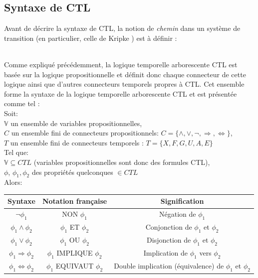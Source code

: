\documentclass[runningheads,a4paper,10pt]{llncs}
\begin{document}
\subsection{Syntaxe de CTL} \label{sec:syntaxe-CTL}
Avant de décrire la syntaxe de CTL, la notion de \textit{chemin} dans un système de transition (en particulier, celle de Kripke ) est à définir : 

\noindent{}  \\

Comme expliqué précédemment, la logique temporelle arborescente CTL est basée sur la logique propositionnelle et définit donc chaque connecteur de cette logique ainsi que d'autres connecteurs temporels propres à CTL. Cet ensemble forme la syntaxe de la logique temporelle arborescente CTL et est présentée comme tel : \\

Soit: \\
$\mathbb{V}$ un ensemble de variables propositionnelles, \\
$C$ un ensemble fini de connecteurs propositionnels: $C = \{\wedge, \vee, \neg, \Rightarrow, \Leftrightarrow \}$, \\
$T$ un ensemble fini de connecteurs temporels : $T = \{X, F, G, U, A, E\}$ \\

Tel que:\\
$\mathbb{V} \subseteq CTL$ (variables propositionnelles sont donc des formules CTL), \\
$\phi$, $\phi_{1}, \phi_{2}$ des propriétés quelconques $\in CTL$ \\

Alors: \\

\begin{center}
\begin{tabular}{|c|c|c|}
  \hline
  Syntaxe & Notation française & Signification \\
  \hline
  $\neg\phi_{1}$ & NON $\phi_{1}$ & Négation de $\phi_{1}$ \\
  $\phi_{1} \wedge \phi_{2}$ & $\phi_{1}$ ET $\phi_{2}$ & Conjonction de $\phi_{1}$ et $\phi_{2}$\\
  $\phi_{1} \vee \phi_{2}$ & $\phi_{1}$ OU $\phi_{2}$ & Disjonction de $\phi_{1}$ et $\phi_{2}$\\
  $\phi_{1} \Rightarrow \phi_{2}$ & $\phi_{1}$ IMPLIQUE $\phi_{2}$ & Implication de $\phi_{1}$ vers $\phi_{2}$\\
  $\phi_{1} \Leftrightarrow \phi_{2}$ & $\phi_{1}$ EQUIVAUT $\phi_{2}$ & Double implication (équivalence) de $\phi_{1}$ et $\phi_{2}$\\
 \hline
 
\end{tabular}
 \label{tab:syntax-ctl-prop}
\end{center}
\end{document}
